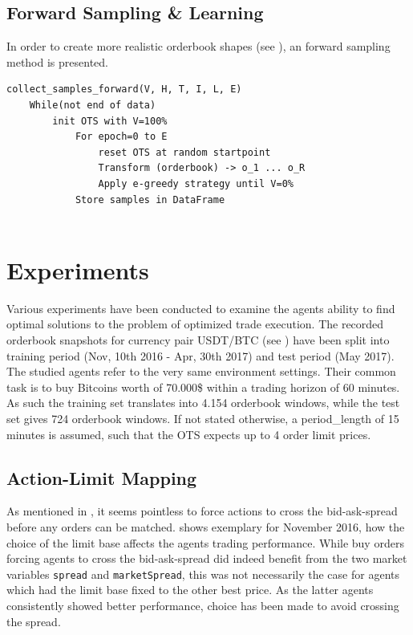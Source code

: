


\subsection{Forward Sampling \& Learning}
In order to create more realistic orderbook shapes (see ), an forward sampling method is presented.


\begin{lstlisting}[frame=single, breaklines=true, basicstyle=\scriptsize, caption=Forward sampling approach., label=lst:forward:pseudocode]
collect_samples_forward(V, H, T, I, L, E)
    While(not end of data)
        init OTS with V=100%
            For epoch=0 to E
                reset OTS at random startpoint
	            Transform (orderbook) -> o_1 ... o_R
	            Apply e-greedy strategy until V=0%
		    Store samples in DataFrame
		    
\end{lstlisting}







\section{Experiments}
\label{chap:experiments}
Various experiments have been conducted to examine the agents ability to find optimal solutions to the problem of optimized trade execution. The recorded orderbook snapshots for currency pair USDT/BTC (see ) have been split into training period (Nov, 10th 2016 - Apr, 30th 2017) and test period (May 2017).\\

The studied agents refer to the very same environment settings. Their common task is to buy Bitcoins worth of 70.000\$ within a trading horizon of 60 minutes. As such the training set translates into 4.154 orderbook windows, while the test set gives 724 orderbook windows. If not stated otherwise, a period\_length of 15 minutes is assumed, such that the \ac{OTS} expects up to 4 order limit prices.



\subsection{Action-Limit Mapping}
\label{chap:exp:actionlimitmapping}
As mentioned in , it seems pointless to force actions to cross the bid-ask-spread before any orders can be matched.  shows exemplary for November 2016, how the choice of the limit base affects the agents trading performance. While buy orders forcing agents to cross the bid-ask-spread did indeed benefit from the two market variables \lstinline!spread! and \lstinline!marketSpread!, this was not necessarily the case for agents which had the limit base fixed to the other best price. As the latter agents consistently showed better performance, choice has been made to avoid crossing the spread.


